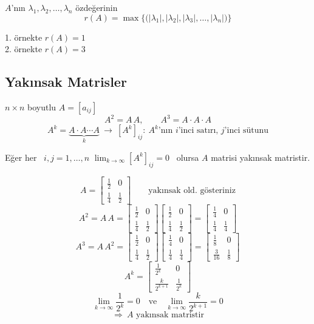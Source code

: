 \documentclass[11pt,a4paper]{article}
\begin{document}
$A$'nın \quad $\lambda_1,\lambda_2,\dots,\lambda_n$ \quad özdeğerinin
\[ r(A)=\max\bigl\{\bigl(|\lambda_1|,|\lambda_2|,|\lambda_3|,\dots,|\lambda_n|\bigr)\bigr\} \]

1. örnekte $r(A)=1$\\
2. örnekte $r(A)=3$

\subsection{Yakınsak Matrisler}
$n\times n$ boyutlu \quad $A=[a_{ij}]$
\[ A^2=A\,A,\qquad A^3=A\cdot A\cdot A \]
\[
  A^k=\underbrace{A\cdot A\cdots A}_{k} \ \longrightarrow\ [A^k]_{ij} :\ A^k\text{'nın } i\text{'inci satırı, } j\text{'inci sütunu}
\]

Eğer her \ $i,j=1,\dots,n$ \quad $\displaystyle\lim_{k\to\infty}[A^k]_{ij}=0$ \
olursa $A$ matrisi yakınsak matristir.

\[ A=\begin{bmatrix}\frac12&0\\[1mm]\frac14&\frac12\end{bmatrix} \qquad \text{yakınsak old. gösteriniz} \]
\[
  A^2=A\,A=\begin{bmatrix}\frac12&0\\[1mm]\frac14&\frac12\end{bmatrix}\begin{bmatrix}\frac12&0\\[1mm]\frac14&\frac12\end{bmatrix}
  =\begin{bmatrix}\frac14&0\\[1mm]\frac14&\frac14\end{bmatrix}
\]
\[
  A^3=A\,A^2=\begin{bmatrix}\frac12&0\\[1mm]\frac14&\frac12\end{bmatrix}\begin{bmatrix}\frac14&0\\[1mm]\frac14&\frac14\end{bmatrix}
  =\begin{bmatrix}\frac18&0\\[1mm]\frac{3}{16}&\frac18\end{bmatrix}
\]
\[
  A^k=\begin{bmatrix}\frac{1}{2^k}&0\\[1mm]\frac{k}{2^{k+1}}&\frac{1}{2^k}\end{bmatrix}
\]
\[
  \lim_{k\to\infty}\frac{1}{2^k}=0 \quad\text{ve}\quad \lim_{k\to\infty}\frac{k}{2^{k+1}}=0
\]
\[ \Longrightarrow\ A \text{ yakınsak matristir} \]
\end{document}
